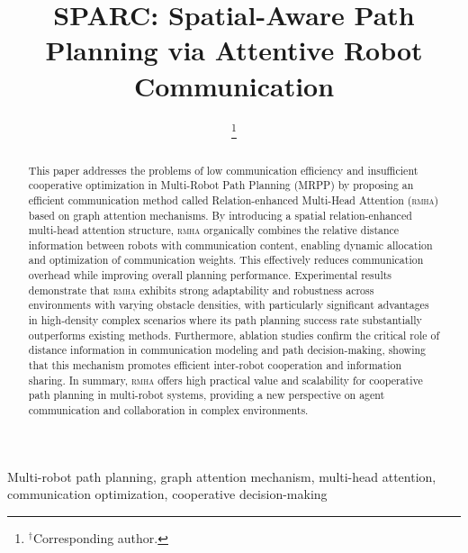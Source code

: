 \documentclass[conference]{IEEEtran}
\newcommand{\rmha}{\textsc{rmha}}
\begin{document}
\title{SPARC: Spatial-Aware Path Planning via Attentive Robot Communication}

\author{
\thanks{$^{\dagger}$Corresponding author.}
}

\maketitle

\begin{abstract}
This paper addresses the problems of low communication efficiency
and insufficient cooperative optimization in Multi-Robot Path
Planning (MRPP) by proposing an efficient communication method
called Relation-enhanced Multi-Head Attention (\rmha) based on
graph attention mechanisms.
By introducing a spatial relation-enhanced multi-head attention
structure, \rmha{} organically combines the relative distance
information between robots with communication content, enabling
dynamic allocation and optimization of communication weights.
This effectively reduces communication overhead while improving
overall planning performance.
Experimental results demonstrate that \rmha{} exhibits strong
adaptability and robustness across environments with varying
obstacle densities, with particularly significant advantages in
high-density complex scenarios where its path planning success
rate substantially outperforms existing methods.
Furthermore, ablation studies confirm the critical role of
distance information in communication modeling and path
decision-making, showing that this mechanism promotes efficient
inter-robot cooperation and information sharing.
In summary, \rmha{} offers high practical value and scalability
for cooperative path planning in multi-robot systems, providing
a new perspective on agent communication and collaboration in
complex environments.
\end{abstract}

\begin{IEEEkeywords}
Multi-robot path planning, graph attention mechanism, multi-head
attention, communication optimization, cooperative decision-making
\end{IEEEkeywords}
\end{document}
